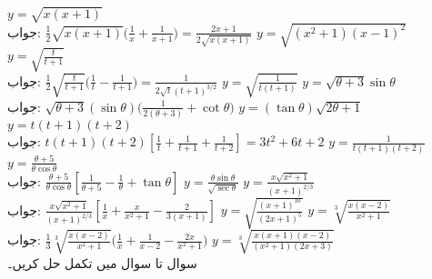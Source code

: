 $y=\sqrt{x(x+1)}$\\
جواب:\quad
$\tfrac{1}{2}\sqrt{x(x+1)}\big(\tfrac{1}{x}+\tfrac{1}{x+1}\big)=\tfrac{2x+1}{2\sqrt{x(x+1)}}$
$y=\sqrt{(x^2+1)(x-1)^2}$
$y=\sqrt{\frac{t}{t+1}}$\\
جواب:\quad
$\tfrac{1}{2}\sqrt{\tfrac{t}{t+1}}\big(\tfrac{1}{t}-\tfrac{1}{t+1}\big)=\tfrac{1}{2\sqrt{t}(t+1)^{3/2}}$
$y=\sqrt{\frac{1}{t(t+1)}}$
$y=\sqrt{\theta+3}\sin\theta$\\
جواب:\quad
$\sqrt{\theta+3}(\sin\theta)\big(\tfrac{1}{2(\theta+3)}+\cot \theta\big)$
$y=(\tan\theta)\sqrt{2\theta+1}$
$y=t(t+1)(t+2)$\\
جواب:\quad
$t(t+1)(t+2)[\tfrac{1}{t}+\tfrac{1}{t+1}+\tfrac{1}{t+2}]=3t^2+6t+2$
$y=\frac{1}{t(t+1)(t+2)}$
$y=\frac{\theta+5}{\theta\cos\theta}$\\
جواب:\quad
$\tfrac{\theta+5}{\theta\cos\theta}[\tfrac{1}{\theta+5}-\tfrac{1}{\theta}+\tan\theta]$
$y=\frac{\theta\sin\theta}{\sqrt{\sec\theta}}$
$y=\frac{x\sqrt{x^2+1}}{(x+1)^{2/3}}$\\
جواب:\quad
$\tfrac{x\sqrt{x^2+1}}{(x+1)^{2/3}}[\tfrac{1}{x}+\tfrac{x}{x^2+1}-\tfrac{2}{3(x+1)}]$
$y=\sqrt{\frac{(x+1)^{10}}{(2x+1)^5}}$
$y=\sqrt[3]{\frac{x(x-2)}{x^2+1}}$\\
جواب:\quad
$\tfrac{1}{3}\sqrt[3]{\tfrac{x(x-2)}{x^2+1}}\big(\tfrac{1}{x}+\tfrac{1}{x-2}-\tfrac{2x}{x^2+1}\big)$
$y=\sqrt[3]{\frac{x(x+1)(x-2)}{(x^2+1)(2x+3)}}$
\\
سوال  تا سوال  میں تکمل حل کریں۔

